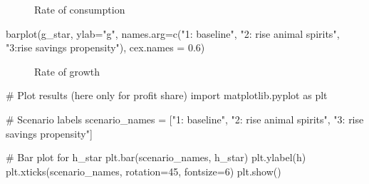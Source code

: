 \documentclass[
  letterpaper,
  DIV=11,
  numbers=noendperiod]{scrreprt}
\newenvironment{Shaded}{\begin{snugshade}}{\end{snugshade}}
\newcommand{\AttributeTok}[1]{\textcolor[rgb]{0.40,0.45,0.13}{#1}}
\newcommand{\CommentTok}[1]{\textcolor[rgb]{0.37,0.37,0.37}{#1}}
\newcommand{\DecValTok}[1]{\textcolor[rgb]{0.68,0.00,0.00}{#1}}
\newcommand{\FloatTok}[1]{\textcolor[rgb]{0.68,0.00,0.00}{#1}}
\newcommand{\FunctionTok}[1]{\textcolor[rgb]{0.28,0.35,0.67}{#1}}
\newcommand{\ImportTok}[1]{\textcolor[rgb]{0.00,0.46,0.62}{#1}}
\newcommand{\NormalTok}[1]{\textcolor[rgb]{0.00,0.23,0.31}{#1}}
\newcommand{\OperatorTok}[1]{\textcolor[rgb]{0.37,0.37,0.37}{#1}}
\newcommand{\StringTok}[1]{\textcolor[rgb]{0.13,0.47,0.30}{#1}}
\begin{document}
\begin{figure}[H]


\caption{\label{fig-consumption-kaldor-robinson}Rate of consumption}

\end{figure}%

\begin{Shaded}
\begin{Highlighting}[]
\FunctionTok{barplot}\NormalTok{(g\_star, }\AttributeTok{ylab=}\StringTok{"g"}\NormalTok{, }\AttributeTok{names.arg=}\FunctionTok{c}\NormalTok{(}\StringTok{"1: baseline"}\NormalTok{, }\StringTok{"2: rise animal spirits"}\NormalTok{, }\StringTok{"3:rise savings propensity"}\NormalTok{), }\AttributeTok{cex.names =} \FloatTok{0.6}\NormalTok{)}
\end{Highlighting}
\end{Shaded}

\begin{figure}[H]


\caption{\label{fig-growth-kaldor-robinson}Rate of growth}

\end{figure}%

\begin{tcolorbox}[enhanced jigsaw, titlerule=0mm, breakable, bottomrule=.15mm, toprule=.15mm, colbacktitle=quarto-callout-note-color!10!white, rightrule=.15mm, toptitle=1mm, opacityback=0, left=2mm, coltitle=black, title=\textcolor{quarto-callout-note-color}{\faInfo}\hspace{0.5em}{Python code}, colframe=quarto-callout-note-color-frame, opacitybacktitle=0.6, leftrule=.75mm, bottomtitle=1mm, arc=.35mm, colback=white]

\begin{Shaded}
\begin{Highlighting}[]
\CommentTok{\# Plot results (here only for profit share) }
\ImportTok{import}\NormalTok{ matplotlib.pyplot }\ImportTok{as}\NormalTok{ plt}

\CommentTok{\# Scenario labels}
\NormalTok{scenario\_names }\OperatorTok{=}\NormalTok{ [}\StringTok{"1: baseline"}\NormalTok{, }\StringTok{"2: rise animal spirits"}\NormalTok{, }\StringTok{"3: rise savings propensity"}\NormalTok{]}

\CommentTok{\# Bar plot for h\_star}
\NormalTok{plt.bar(scenario\_names, h\_star)}
\NormalTok{plt.ylabel(}\StringTok{\textquotesingle{}h\textquotesingle{}}\NormalTok{)}
\NormalTok{plt.xticks(scenario\_names, rotation}\OperatorTok{=}\DecValTok{45}\NormalTok{, fontsize}\OperatorTok{=}\DecValTok{6}\NormalTok{)}
\NormalTok{plt.show()}
\end{Highlighting}
\end{Shaded}

\end{tcolorbox}
\end{document}
